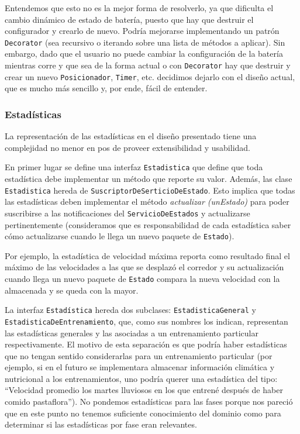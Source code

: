 \documentclass[10pt, a4paper,english,spanish]{article}
\begin{document}
Entendemos que esto no es la mejor forma de resolverlo, ya que dificulta el cambio dinámico de estado de batería, puesto que hay que destruir el configurador y crearlo de nuevo. Podría mejorarse implementando un patrón \texttt{Decorator} (sea recursivo o iterando sobre una lista de métodos a aplicar). Sin embargo, dado que el usuario no puede cambiar la configuración de la batería mientras corre y que sea de la forma actual o con \texttt{Decorator} hay que destruir y crear un nuevo \texttt{Posicionador}, \texttt{Timer}, etc. decidimos dejarlo con el diseño actual, que es mucho más sencillo y, por ende, fácil de entender.

\subsubsection{Estadísticas}
La representación de las estadísticas en el diseño presentado tiene una complejidad no menor en pos de proveer extensibilidad y usabilidad. 

En primer lugar se define una interfaz \texttt{Estadistica} que define que toda estadística debe implementar un método que reporte su valor. Además, las clase \texttt{Estadistica} hereda de \texttt{SuscriptorDeSerticioDeEstado}. Esto implica que todas las estadísticas deben implementar el método \emph{actualizar (unEstado)} para poder suscribirse a las notificaciones del \texttt{ServicioDeEstados} y actualizarse pertinentemente (consideramos que es responsabilidad de cada estadística saber cómo actualizarse cuando le llega un nuevo paquete de \texttt{Estado}). 

Por ejemplo, la estadística de velocidad máxima reporta como resultado final el máximo de las velocidades a las que se desplazó el corredor y su actualización cuando llega un nuevo paquete de \texttt{Estado} compara la nueva velocidad con la almacenada y se queda con la mayor. 

La interfaz \texttt{Estadística} hereda dos subclases: \texttt{EstadisticaGeneral} y \texttt{EstadisticaDeEntrenamiento}, que, como sus nombres los indican, representan las estadísticas generales y las asociadas a un entrenamiento particular respectivamente. El motivo de esta separación es que podría haber estadísticas que no tengan sentido considerarlas para un entrenamiento particular (por ejemplo, si en el futuro se implementara almacenar información climática y nutricional a los entrenamientos, uno podría querer una estadística del tipo: ``Velocidad promedio los martes lluviosos en los que entrené después de haber comido pastaflora''). No pondemos estadísticas para las fases porque nos pareció que en este punto no tenemos suficiente conocimiento del dominio como para determinar si las estadísticas por fase eran relevantes.
\end{document}
